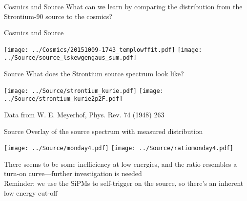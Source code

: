 \documentclass[compress,8pt]{beamer} %
\begin{document}
\begin{frame}{Cosmics and Source}
What can we learn by comparing the distribution from the Strontium-90 source to the cosmics?
\end{frame}


\begin{frame}{Cosmics and Source}
\begin{adjustwidth}{-2em}{-2em}
\begin{center}
\texttt{[image: ../Cosmics/20151009-1743\_templowffit.pdf]}
\texttt{[image: ../Source/source\_lskewgengaus\_sum.pdf]}
\end{center}
\end{adjustwidth}
\end{frame}



\begin{frame}{Source}
What does the Strontium source spectrum look like?
\begin{adjustwidth}{-2em}{-2em}
\begin{center}
\texttt{[image: ../Source/strontium\_kurie.pdf]}
\texttt{[image: ../Source/strontium\_kurie2p2F.pdf]}
\end{center}
\end{adjustwidth}
Data from W. E. Meyerhof, Phys. Rev. 74 (1948) 263
\end{frame}



\begin{frame}{Source}
Overlay of the source spectrum with measured distribution
\begin{adjustwidth}{-2em}{-2em}
\begin{center}
\texttt{[image: ../Source/monday4.pdf]}
\texttt{[image: ../Source/ratiomonday4.pdf]}
\end{center}
\end{adjustwidth}
There seems to be some inefficiency at low energies, and the ratio resembles a
turn-on curve---further investigation is needed \\
Reminder: we use the SiPMs to self-trigger on the source, so there's
an inherent low energy cut-off
\end{frame}
\end{document}
